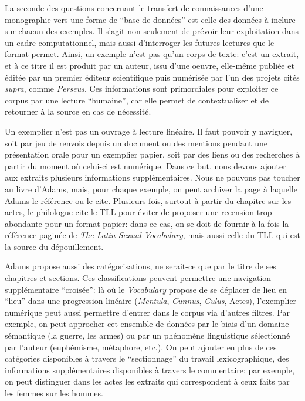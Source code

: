 La seconde des questions concernant le transfert de connaissances d'une monographie vers une forme de \enquote{base de données} est celle des données à inclure sur chacun des exemples. Il s'agit non seulement de prévoir leur exploitation dans un cadre computationnel, mais aussi d'interroger les futures lectures que le format permet. Ainsi, un exemple n'est pas qu'un corps de texte: c'est un extrait, et à ce titre il est produit par un auteur, issu d'une oeuvre, elle-même publiée et éditée par un premier éditeur scientifique puis numérisée par l'un des projets cités \textit{supra}, comme \textit{Perseus}. Ces informations sont primordiales pour exploiter ce corpus par une lecture \enquote{humaine}, car elle permet de contextualiser et de retourner à la source en cas de nécessité. 

Un exemplier n'est pas un ouvrage à lecture linéaire. Il faut pouvoir y naviguer, soit par jeu de renvois depuis un document ou des mentions pendant une présentation orale pour un exemplier papier, soit par des liens ou des recherches à partir du moment où celui-ci est numérique. Dans ce but, nous devons ajouter aux extraits plusieurs informations supplémentaires. Nous ne pouvons pas toucher au livre d'Adams, mais, pour chaque exemple, on peut archiver la page à laquelle Adams le référence ou le cite. Plusieurs fois, surtout à partir du chapitre sur les actes, le philologue cite le TLL pour éviter de proposer une recension trop abondante pour un format papier: dans ce cas, on se doit de fournir à la fois la référence paginée de \textit{The Latin Sexual Vocabulary}, mais aussi celle du TLL qui est la source du dépouillement.

Adams propose aussi des catégorisations, ne serait-ce que par le titre de ses chapitres et sections. Ces classifications peuvent permettre une navigation supplémentaire \enquote{croisée}: là où le \textit{Vocabulary} propose de se déplacer de lieu en \enquote{lieu} dans une progression linéaire (\textit{Mentula}, \textit{Cunnus}, \textit{Culus}, Actes), l'exemplier numérique peut aussi permettre d'entrer dans le corpus via d'autres filtres. Par exemple, on peut approcher cet ensemble de données par le biais d'un domaine sémantique (la guerre, les armes) ou par un phénomène linguistique sélectionné par l'auteur (euphémisme, métaphore, etc.). On peut ajouter en plus de ces catégories disponibles à travers le \enquote{sectionnage} du travail lexicographique, des informations supplémentaires disponibles à travers le commentaire: par exemple, on peut distinguer dans les actes les extraits qui correspondent à ceux faits par les femmes sur les hommes.

